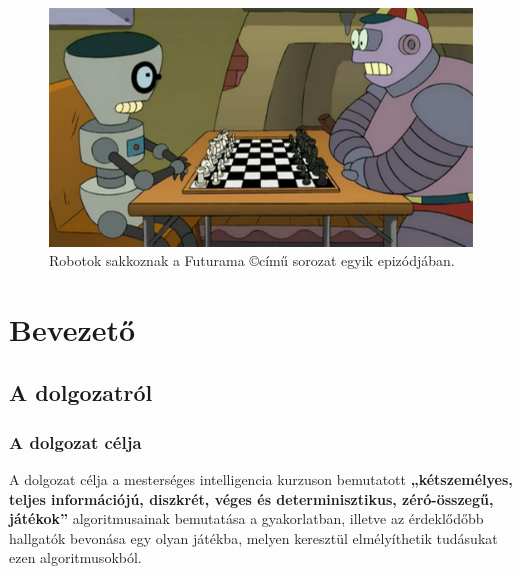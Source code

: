 \documentclass[twoside, a4paper, 12pt]{book}
\title{\THESISTITLE}
\author{\THESISAUTHOR}
\date{\THESISDEFENCEYEAR}
\begin{document}
\raggedbottom
\frontmatter
\pagestyle{empty}


\cleardoublepage

\null
\vspace*{\fill}
\begin{figure}[htbp]
	\centering
	\includegraphics[width=1.0\textwidth]{img/bots_chess.png}
	\caption{Robotok sakkoznak a Futurama \copyright című sorozat egyik epizódjában.}
	\label{fig:bots_chess}
\end{figure}
\vspace*{\fill}
\null
\cleardoublepage
\tableofcontents

\pagestyle{plain}
\setcounter{page}{1}




\mainmatter
\newpage
\part{Bevezető}
\chapter{A dolgozatról}
\section{A dolgozat célja}
A dolgozat célja a mesterséges intelligencia kurzuson bemutatott \textbf{„kétszemélyes, teljes információjú, diszkrét, véges és determinisztikus, zéró-összegű, játékok”} algoritmusainak bemutatása a gyakorlatban, illetve az érdeklődőbb hallgatók bevonása egy olyan játékba, melyen keresztül elmélyíthetik tudásukat ezen algoritmusokból.
\end{document}
